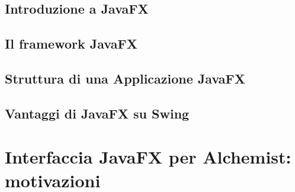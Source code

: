         \subsection{Introduzione a JavaFX}\label{sub:jfxIntro}
        \subsection{Il framework JavaFX}\label{sub:jfxFramework}
        \subsection{Struttura di una Applicazione JavaFX}\label{sub:jfxStruttura}
        \subsection{Vantaggi di JavaFX su Swing}\label{sub:jfxVantaggi}
    \section{Interfaccia JavaFX per Alchemist: motivazioni}\label{sec:motivi}
